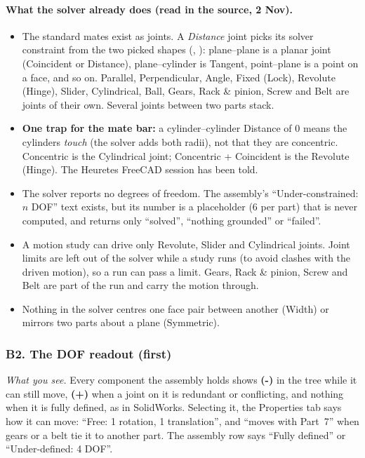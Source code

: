 \paragraph{What the solver already does (read in the source, 2 Nov).}
\begin{itemize}
  \item The standard mates exist as joints. A \emph{Distance} joint picks its solver constraint from the two
        picked shapes (, ): plane--plane is a planar joint
        (Coincident or Distance), plane--cylinder is Tangent, point--plane is a point on a face, and so on.
        Parallel, Perpendicular, Angle, Fixed (Lock), Revolute (Hinge), Slider, Cylindrical, Ball, Gears, Rack \&
        pinion, Screw and Belt are joints of their own. Several joints between two parts stack.
  \item \textbf{One trap for the mate bar:} a cylinder--cylinder Distance of 0 means the cylinders \emph{touch}
        (the solver adds both radii), not that they are concentric. Concentric is the Cylindrical joint;
        Concentric + Coincident is the Revolute (Hinge). The Heuretes FreeCAD session has been told.
  \item The solver reports no degrees of freedom. The assembly's ``Under-constrained: $n$ DOF'' text exists, but
        its number is a placeholder (6 per part) that is never computed, and  returns only
        ``solved'', ``nothing grounded'' or ``failed''.
  \item A motion study can drive only Revolute, Slider and Cylindrical joints. Joint limits are left out of the
        solver while a study runs (to avoid clashes with the driven motion), so a run can pass a limit. Gears,
        Rack \& pinion, Screw and Belt are part of the run and carry the motion through.
  \item Nothing in the solver centres one face pair between another (Width) or mirrors two parts about a plane
        (Symmetric).
\end{itemize}

\subsubsection*{B2. The DOF readout (first)}

\emph{What you see.} Every component the assembly holds shows \textbf{(-)} in the tree while it can still move,
\textbf{(+)} when a joint on it is redundant or conflicting, and nothing when it is fully defined, as in
SolidWorks. Selecting it, the Properties tab says how it can move: ``Free: 1 rotation, 1 translation'', and
``moves with Part~7'' when gears or a belt tie it to another part. The assembly row says ``Fully defined'' or
``Under-defined: 4 DOF''.

